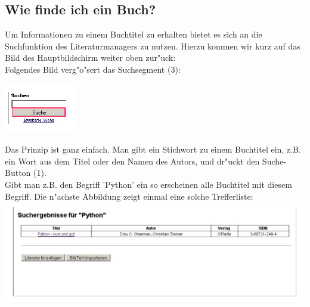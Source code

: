 \subsection{Wie finde ich ein Buch?}
Um Informationen zu einem Buchtitel zu erhalten bietet es sich an die Suchfunktion des Literaturmanagers zu nutzen. Hierzu kommen wir kurz auf das Bild des Hauptbildschirm weiter oben zur"uck:\\
Folgendes Bild verg"o"sert das Suchsegment (3):\\
\begin{center}
\includegraphics[scale=2.0]{suche.pdf}\\
\end{center}
Das Prinzip ist ganz einfach. Man gibt ein Stichwort zu einem Buchtitel ein, z.B. ein Wort aus dem Titel oder den Namen des Autors, und dr"uckt den Suche-Button (1).\\
Gibt man z.B. den Begriff 'Python' ein so erscheinen alle Buchtitel mit diesem Begriff. Die n"achste Abbildung zeigt einmal eine solche Trefferliste:\\
\includegraphics[scale=0.8]{treffer.pdf}\\
